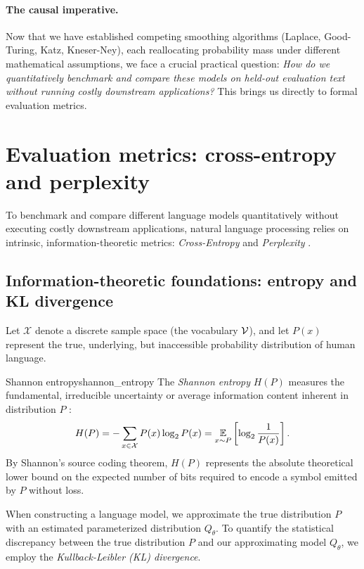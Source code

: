 \documentclass[../../main.tex]{subfiles}
\begin{document}
\paragraph{The causal imperative.}
Now that we have established competing smoothing algorithms (Laplace, Good-Turing, Katz, Kneser-Ney), each reallocating probability mass under different mathematical assumptions, we face a crucial practical question: \emph{How do we quantitatively benchmark and compare these models on held-out evaluation text without running costly downstream applications?} This brings us directly to formal evaluation metrics.


\clearpage
\section{Evaluation metrics: cross-entropy and perplexity}
\label{sec:eval_metrics}

To benchmark and compare different language models quantitatively without executing costly downstream applications, natural language processing relies on intrinsic, information-theoretic metrics: \emph{Cross-Entropy} and \emph{Perplexity} \cite{shannon1948,jurafsky2024}.

\subsection{Information-theoretic foundations: entropy and KL divergence}
Let $\mathcal{X}$ denote a discrete sample space (the vocabulary $\mathcal{V}$), and let $P(x)$ represent the true, underlying, but inaccessible probability distribution of human language. 

\begin{definition}{Shannon entropy}{shannon_entropy}
The \emph{Shannon entropy} $H(P)$ measures the fundamental, irreducible uncertainty or average information content inherent in distribution $P$ \cite{shannon1948}:
\begin{equation}
\label{eq:shannon_entropy}
H(P) = - \sum_{x \in \mathcal{X}} P(x) \log_2 P(x) = \operatorname*{\mathbb{E}}_{x \sim P}\left[ \log_2 \frac{1}{P(x)} \right].
\end{equation}
By Shannon's source coding theorem, $H(P)$ represents the absolute theoretical lower bound on the expected number of bits required to encode a symbol emitted by $P$ without loss.
\end{definition}

When constructing a language model, we approximate the true distribution $P$ with an estimated parameterized distribution $Q_\theta$. To quantify the statistical discrepancy between the true distribution $P$ and our approximating model $Q_\theta$, we employ the \emph{Kullback-Leibler (KL) divergence}.
\end{document}
